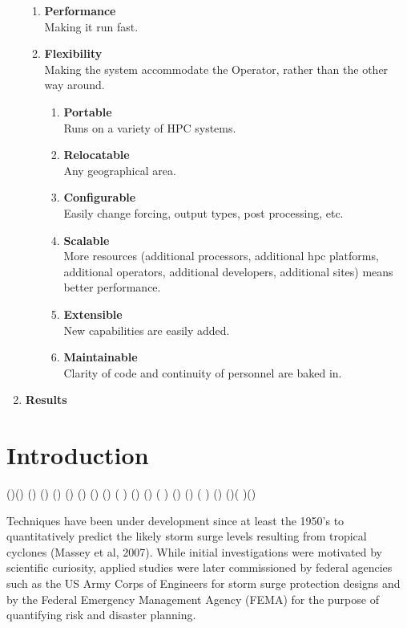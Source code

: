 \documentclass[12pt]{article}
\begin{document}
\begin{enumerate}
\begin{enumerate}
\item \textbf{Performance} \\
Making it run fast. 
\item \textbf{Flexibility} \\
Making the system accommodate the Operator, rather than the other way around.
\begin{enumerate}
\item \textbf{Portable} \\
Runs on a variety of HPC systems.
\item \textbf{Relocatable} \\
Any geographical area.
\item \textbf{Configurable} \\
Easily change forcing, output types, post processing, etc.
\item \textbf{Scalable} \\
More resources (additional processors, additional hpc platforms, additional operators, additional developers, additional sites) means better performance.
\item \textbf{Extensible} \\
New capabilities are easily added.
\item \textbf{Maintainable} \\
Clarity of code and continuity of personnel are baked in.
\end{enumerate}
\end{enumerate}
\item \textbf{Results}
\end{enumerate}

\section{Introduction}

(\cite{LynchDR2004})(\cite {ASGSOperatorsGuide2011}) (\cite
{ASGSDevelopersGuide2011}) (\cite {DietrichJC2012}) (\cite
{FlatherRA1994}) (\cite{GraberHC2006}) (\cite {HollandGJ1980}) (\cite
{HoustonSH1999}) (\cite{HubbertGD1991}) ( \cite {LynchDR2004}) (\cite
{MasseyWG2007}) (\cite{OConnorWP1999}) ( \cite {VerlaanM2005}) (\cite
{XieL2006})  (\cite{KennedyA2010}) ( \cite{GlahnB2009})
(\cite{GlahnB2009}) (\cite{KimSC1996})( \cite{BooijN1999})(\cite
{ChuP2009})

Techniques have been under development since at least the 1950’s to 
quantitatively predict the likely storm surge levels resulting from 
tropical cyclones (Massey et al, 2007). While initial investigations 
were motivated by scientific curiosity, applied studies were later 
commissioned by federal agencies such as the US Army Corps of 
Engineers for storm surge protection designs and by the Federal 
Emergency Management Agency (FEMA) for the purpose of quantifying 
risk and disaster planning. 
\end{document}
